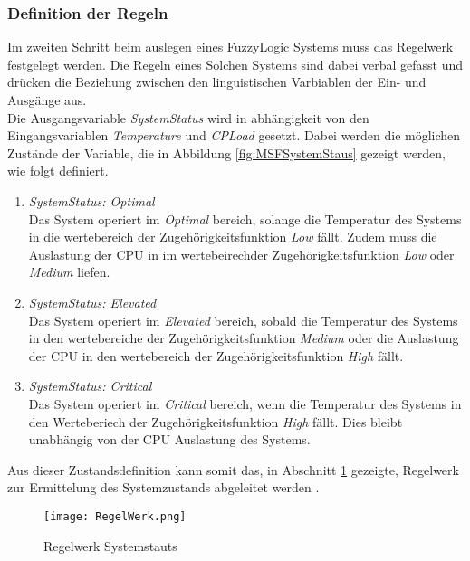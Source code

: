 \subsubsection*{Definition der Regeln}
Im zweiten Schritt beim auslegen eines FuzzyLogic Systems muss das Regelwerk festgelegt werden. Die Regeln eines Solchen Systems sind dabei verbal gefasst und drücken die Beziehung zwischen den linguistischen Varbiablen der Ein- und Ausgänge aus.\cite{FLRegelwerk} \\
Die Ausgangsvariable \textit{SystemStatus} wird in abhängigkeit von den Eingangsvariablen \textit{Temperature} und \textit{CPLoad} gesetzt. Dabei werden die möglichen Zustände der Variable, die in Abbildung \ref{fig:MSFSystemStaus} gezeigt werden, wie folgt definiert. 
\begin{enumerate}
    \item \textit{SystemStatus: Optimal}\\
    Das System operiert im \textit{Optimal} bereich, solange die Temperatur des Systems in die wertebereich der Zugehörigkeitsfunktion \textit{Low} fällt. Zudem muss die Auslastung der CPU in im wertebeirechder Zugehörigkeitsfunktion \textit{Low} oder \textit{Medium} liefen.  
    \item \textit{SystemStatus: Elevated}\\
    Das System operiert im \textit{Elevated} bereich, sobald die Temperatur des Systems in den wertebereiche der Zugehörigkeitsfunktion \textit{Medium} oder die Auslastung der CPU in den wertebereich der Zugehörigkeitsfunktion \textit{High} fällt.
    \item \textit{SystemStatus: Critical}\\
    Das System operiert im \textit{Critical} bereich, wenn die Temperatur des Systems in den Werteberiech der Zugehörigkeitsfunktion \textit{High} fällt. Dies bleibt unabhängig von der CPU Auslastung des Systems. 
\end{enumerate}
Aus dieser Zustandsdefinition kann somit das, in Abschnitt \ref{fig:FuzzyLogicRuleBase} gezeigte, Regelwerk zur Ermittelung des Systemzustands abgeleitet werden .  
\begin{center}
    \begin{figure}[h!]
        \centering
        \texttt{[image: RegelWerk.png]}
        \caption{Regelwerk Systemstauts}
        \label{fig:FuzzyLogicRuleBase}
    \end{figure}
\end{center}
\vspace{-0.5cm}  

